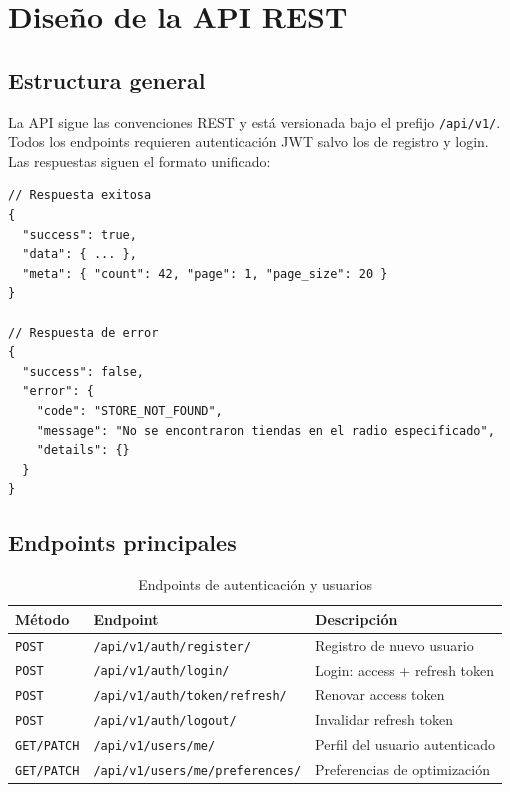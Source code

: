 \section{Dise\~no de la API REST}\label{sec:api}

\subsection{Estructura general}\label{subsec:api-estructura}

La API sigue las convenciones REST y est\'a versionada bajo el prefijo \texttt{/api/v1/}. Todos
los endpoints requieren autenticaci\'on JWT salvo los de registro y login. Las respuestas siguen
el formato unificado:

\begin{verbatim}
// Respuesta exitosa
{
  "success": true,
  "data": { ... },
  "meta": { "count": 42, "page": 1, "page_size": 20 }
}

// Respuesta de error
{
  "success": false,
  "error": {
    "code": "STORE_NOT_FOUND",
    "message": "No se encontraron tiendas en el radio especificado",
    "details": {}
  }
}
\end{verbatim}

\subsection{Endpoints principales}\label{subsec:api-endpoints}

\begin{table}[h]
\caption{Endpoints de autenticaci\'on y usuarios}
\label{tab:api-auth}
\centering
\begin{tabular}{|l|p{6cm}|p{5cm}|}
\hline
\textbf{M\'etodo} & \textbf{Endpoint} & \textbf{Descripci\'on} \\
\hline
\texttt{POST} & \texttt{/api/v1/auth/register/} & Registro de nuevo usuario \\
\texttt{POST} & \texttt{/api/v1/auth/login/} & Login: access + refresh token \\
\texttt{POST} & \texttt{/api/v1/auth/token/refresh/} & Renovar access token \\
\texttt{POST} & \texttt{/api/v1/auth/logout/} & Invalidar refresh token \\
\texttt{GET/PATCH} & \texttt{/api/v1/users/me/} & Perfil del usuario autenticado \\
\texttt{GET/PATCH} & \texttt{/api/v1/users/me/preferences/} & Preferencias de optimizaci\'on \\
\hline
\end{tabular}
\end{table}

